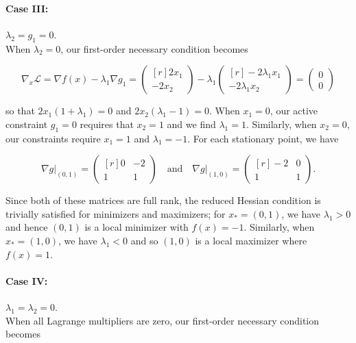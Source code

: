 \begin{solution}
    \pagebreak
    \paragraph{Case III:} $\lambda_2 = g_1 = 0.$ \ \\
    When $\lambda_2 = 0$, our first-order necessary condition becomes

    $$
    \nabla_x \mathcal{L} = \nabla f(x) - \lambda_1 \nabla g_1 = \begin{pmatrix*}[r]
        2 x_1 \\
       -2 x_2
    \end{pmatrix*} - \lambda_1 \begin{pmatrix*}[r]
        -2 \lambda_1 x_1 \\
        -2 \lambda_1 x_2
    \end{pmatrix*} = \begin{pmatrix*}
        0 \\
        0
    \end{pmatrix*}
    $$

    so that $2 x_1 (1 + \lambda_1) = 0$ and $2 x_2 (\lambda_1 - 1) = 0$. When $x_1 = 0$, our active constraint $g_1 = 0$
    requires that $x_2 = 1$ and we find $\lambda_1 = 1$. Similarly, when $x_2 = 0$, our constraints require $x_1 = 1$ and
    $\lambda_1 = -1$. For each stationary point, we have

    $$
    \nabla g \Big|_{(0, 1)} = \begin{pmatrix*}[r]
        0 & -2 \\
        1 &  1
    \end{pmatrix*} \quad \text{and} \quad \nabla g \Big|_{(1, 0)} = \begin{pmatrix*}[r]
       -2 &  0 \\
        1 &  1
    \end{pmatrix*}.
    $$
    
    Since both of these matrices are full rank, the reduced Hessian condition is trivially satisfied for minimizers and
    maximizers; for $x_* = (0, 1)$, we have $\lambda_1 > 0$ and hence $(0, 1)$ is a local minimizer with $f(x) = -1$. 
    Similarly, when $x_* = (1, 0)$, we have $\lambda_1 < 0$ and so $(1, 0)$ is a local maximizer where $f(x) = 1$.

    \paragraph{Case IV:} $\lambda_1 = \lambda_2 = 0.$ \ \\
    When all Lagrange multipliers are zero, our first-order necessary condition becomes


\end{solution}
